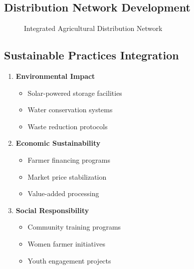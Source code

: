 \subsection{Distribution Network Development}
\begin{figure}[h]
    \centering
    \caption{Integrated Agricultural Distribution Network}
\end{figure}

\subsection{Sustainable Practices Integration}\label{subsec:sustainable-practices-integration}
\begin{tcolorbox}[colback=white,colframe=primary,title=\textbf{Sustainability Framework}]
\begin{enumerate}
    \item \textbf{Environmental Impact}
    \begin{itemize}
        \item Solar-powered storage facilities
        \item Water conservation systems
        \item Waste reduction protocols
    \end{itemize}

    \item \textbf{Economic Sustainability}
    \begin{itemize}
        \item Farmer financing programs
        \item Market price stabilization
        \item Value-added processing
    \end{itemize}

    \item \textbf{Social Responsibility}
    \begin{itemize}
        \item Community training programs
        \item Women farmer initiatives
        \item Youth engagement projects
    \end{itemize}
\end{enumerate}
\end{tcolorbox}
